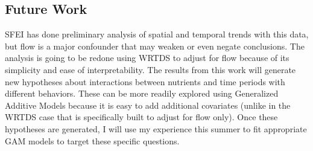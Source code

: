 \documentclass[12pt]{amsart}
\begin{document}
%
%
%
%

\subsection{Future Work}

SFEI has done preliminary analysis of spatial and temporal trends with this data, but flow is a major confounder that may weaken or even negate conclusions. The analysis is going to be redone using WRTDS to adjust for flow because of its simplicity and ease of interpretability. The results from this work will generate new hypotheses about interactions between nutrients and time periods with different behaviors. These can be more readily explored using Generalized Additive Models because it is easy to add additional covariates (unlike in the WRTDS case that is specifically built to adjust for flow only). Once these hypotheses are generated, I will use my experience this summer to fit appropriate GAM models to target these specific questions. 
\end{document}
